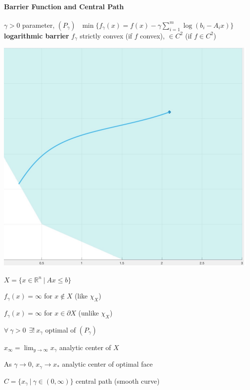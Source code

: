 \documentclass[10pt]{report}
\begin{document}
\paragraph{Barrier Function and Central Path} $\gamma > 0$ parameter, $(P_\gamma)\:\:\:\min\{f_\gamma(x) = f(x) - \gamma\sum_{i=1}^m \log(b_i-A_i x)\}$ \textbf{logarithmic barrier} $f_\gamma$ strictly convex (if $f$ convex), $\in C^2$ (if $f\in C^2$)
\pagebreak
\begin{multicols}{2}
\begin{center}
	\includegraphics[scale=0.6]{15.png}
\end{center}
\begin{list}{}{}
	\item $X=\{x\in \mathbb{R}^n\:|\:Ax\leq b\}$
	\item $f_\gamma(x)=  \infty$ for $x\not\in X$ (like $\chi_X$)
	\item $f_\gamma(x)=  \infty$ for $x\in \partial X$ (unlike $\chi_X$)
	\item $\forall\:\gamma>0\:\:\exists!\:x_\gamma$ optimal of $(P_\gamma)$
	\item $x_\infty = \lim_{y\to\infty} x_\gamma$ analytic center of $X$
	\item As $\gamma \rightarrow 0$, $x_\gamma\rightarrow x_*$ analytic center of optimal face
	\item $C = \{x_\gamma\:|\:\gamma\in(0,\infty)\}$ central path (smooth curve)
\end{list}
\end{multicols}
\end{document}
